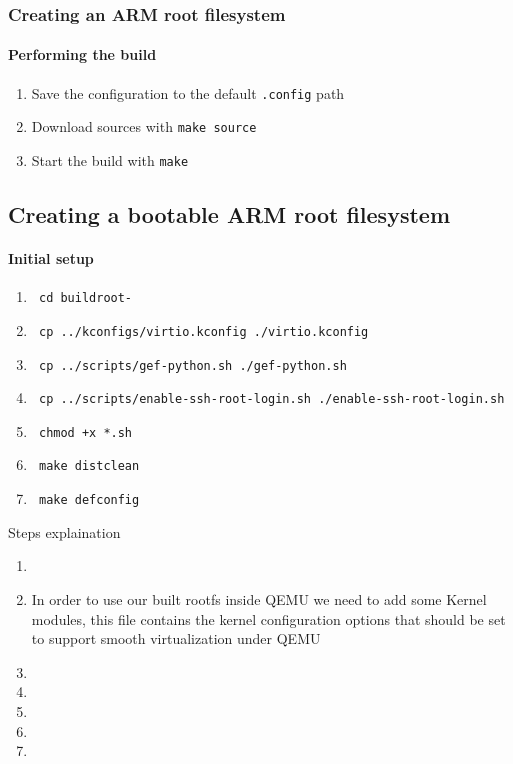 \begin{frame}
  \frametitle{Creating an ARM root filesystem}
  \framesubtitle{Performing the build}
  \begin{enumerate}
    \item Save the configuration to the default \texttt{.config} path
    \item Download sources with \texttt{make source}
    \item Start the build with \texttt{make}
  \end{enumerate}
\end{frame}
\subsection{Creating a bootable ARM root filesystem}
\begin{frame}
  \framesubtitle{Initial setup}

  \begin{enumerate}
    \item \texttt{ cd buildroot-\buildrootLatestVersion }
    \item \texttt{ cp ../kconfigs/virtio.kconfig ./virtio.kconfig }
    \item \texttt{ cp ../scripts/gef-python.sh ./gef-python.sh }
    \item \texttt{ cp ../scripts/enable-ssh-root-login.sh ./enable-ssh-root-login.sh }
    \item \texttt{ chmod +x *.sh }
    \item \texttt{ make distclean }
    \item \texttt{ make defconfig }
  \end{enumerate}

\end{frame}
 {
  Steps explaination
  \begin{enumerate}
    \item \enteringBuildRootDirectoryDescription
    \item In order to use our built rootfs inside QEMU we need to add some Kernel modules,
      this file contains the kernel configuration options that should be set to support smooth virtualization under QEMU
    \item \gefPythonDescription
    \item \sshRootLoginDescription
    \item \scriptShouldBeExecutableDescription
    \item \makeCleanDescription
    \item \makeDefConfigDescription
  \end{enumerate}
}

